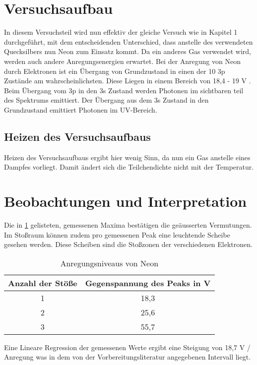 \section{Versuchsaufbau}
In diesem Versuchsteil wird nun effektiv der gleiche Versuch wie in Kapitel 1 durchgeführt, mit dem entscheidenden Unterschied, dass anstelle des verwendeten Quecksilbers nun Neon zum Einsatz kommt.
Da ein anderes Gas verwendet wird, werden auch andere Anregungsenergien erwartet.
Bei der Anregung von Neon durch Elektronen ist ein Übergang von Grundzustand in einen der 10 3p Zustände am wahrscheinlichsten. Diese Liegen in einem Bereich von 18,4 - 19 V \cite{HND1}.
Beim Übergang vom 3p in den 3s Zustand werden Photonen im sichtbaren teil des Spektrums emittiert. Der Übergang aus dem 3s Zustand in den Grundzustand emittiert Photonen im UV-Bereich.
\subsection{Heizen des Versuchsaufbaus}
Heizen des Versuchsaufbaus ergibt hier wenig Sinn, da nun ein Gas anstelle eines Dampfes vorliegt. Damit ändert sich die Teilchendichte nicht mit der Temperatur.
\section{Beobachtungen und Interpretation}
Die in \ref{tab:gemesseneAnregungsenergieNeon} gelisteten, gemessenen Maxima bestätigen die geäusserten Vermutungen.
Im Stoßraum können zudem pro gemessenen Peak eine leuchtende Scheibe gesehen werden. Diese Scheiben sind die Stoßzonen der verschiedenen Elektronen.
\begin{table}
	\centering
	\caption{Anregungsniveaus von Neon}
	\begin{tabular}{c c}
		Anzahl der Stöße & Gegenspannung des Peaks in V \\
		\midrule
		1 & 18,3 \\
		2 & 25,6 \\
		3 & 55,7 \\
	\end{tabular}
	\label{tab:gemesseneAnregungsenergieNeon}
\end{table}
Eine Lineare Regression der gemessenen Werte ergibt eine Steigung von 18,7 V / Anregung was in dem von der Vorbereitungsliteratur angegebenen Intervall liegt.

